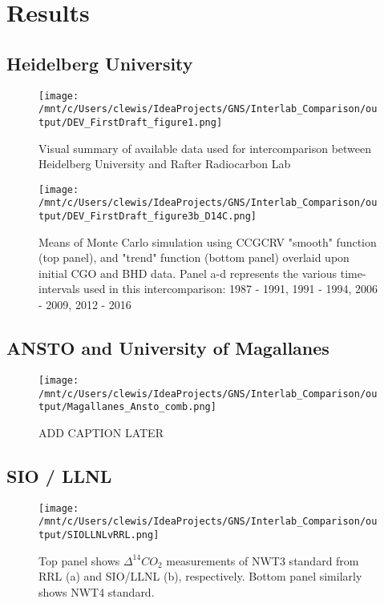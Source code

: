 \section{Results}
\label{sec:Results}


\subsection{Heidelberg University}

\begin{figure}[h!]
  \texttt{[image: /mnt/c/Users/clewis/IdeaProjects/GNS/Interlab\_Comparison/output/DEV\_FirstDraft\_figure1.png]}
  \caption{Visual summary of available data used for intercomparison between Heidelberg University and Rafter Radiocarbon Lab}
  \label{fig:results1}
\end{figure}


\begin{figure}[h!]
  \texttt{[image: /mnt/c/Users/clewis/IdeaProjects/GNS/Interlab\_Comparison/output/DEV\_FirstDraft\_figure3b\_D14C.png]}
  \caption{Means of Monte Carlo simulation using CCGCRV "smooth" function (top panel), and "trend" function (bottom panel) overlaid upon initial CGO and BHD data. Panel a-d represents the various time-intervals used in this intercomparison: 1987 - 1991, 1991 - 1994, 2006 - 2009, 2012 - 2016}
  \label{fig:results1}
\end{figure}


\newpage
\subsection{ANSTO and University of Magallanes}
\begin{figure}[h!]
  \texttt{[image: /mnt/c/Users/clewis/IdeaProjects/GNS/Interlab\_Comparison/output/Magallanes\_Ansto\_comb.png]}
  \caption{ADD CAPTION LATER}
  \label{fig:results1}
\end{figure}

\newpage
\subsection{SIO / LLNL}

\begin{figure}[h!]
  \texttt{[image: /mnt/c/Users/clewis/IdeaProjects/GNS/Interlab\_Comparison/output/SIOLLNLvRRL.png]}
  \caption{Top panel shows ${\Delta^{14}CO_{2}}$ measurements of NWT3 standard from RRL (a) and SIO/LLNL (b), respectively. Bottom panel similarly shows NWT4 standard.}
  \label{fig:results1}
\end{figure}

